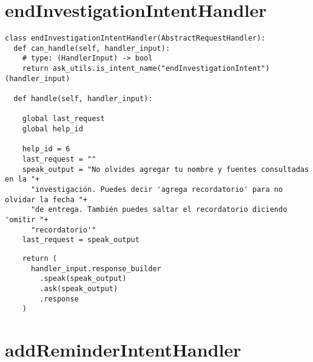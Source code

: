
\section{endInvestigationIntentHandler}
\label{A11Anexo}

\begin{tcolorbox}[colback=white!25!white,colframe=blue]
  \begin{verbatim}
class endInvestigationIntentHandler(AbstractRequestHandler):
  def can_handle(self, handler_input):
    # type: (HandlerInput) -> bool
    return ask_utils.is_intent_name("endInvestigationIntent")(handler_input)

  def handle(self, handler_input):
        
    global last_request
    global help_id
        
    help_id = 6
    last_request = ""
    speak_output = "No olvides agregar tu nombre y fuentes consultadas en la "+
      "investigación. Puedes decir 'agrega recordatorio' para no olvidar la fecha "+
      "de entrega. También puedes saltar el recordatorio diciendo 'omitir "+
      "recordatorio'"
    last_request = speak_output
  \end{verbatim}
\end{tcolorbox}

\begin{tcolorbox}[colback=white!25!white,colframe=blue]
  \begin{verbatim}            
    return (
      handler_input.response_builder
        .speak(speak_output)
        .ask(speak_output)
        .response
    )
  \end{verbatim}
\end{tcolorbox}


\section{addReminderIntentHandler}
\label{A12Anexo}

